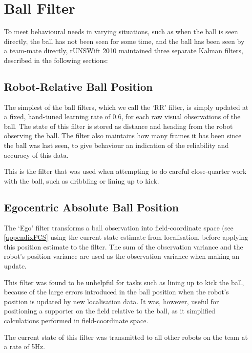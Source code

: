 \documentclass[pdftex,11pt,a4paper]{report}
\begin{document}
\section{Ball Filter} \label{secBallFilter}

To meet behavioural needs in varying situations, such as when the ball is seen directly, the ball has not been seen for some time, and the ball has been seen by a team-mate directly, rUNSWift 2010 maintained three separate Kalman filters, described in the following sections:

\subsection{Robot-Relative Ball Position}

The simplest of the ball filters, which we call the `RR' filter, is simply updated at a fixed, hand-tuned learning rate of 0.6, for each raw visual observations of the ball. The state of this filter is stored as distance and heading from the robot observing the ball. The filter also maintains how many frames it has been since the ball was last seen, to give behaviour an indication of the reliability and accuracy of this data.

This is the filter that was used when attempting to do careful close-quarter work with the ball, such as dribbling or lining up to kick.

\subsection{Egocentric Absolute Ball Position}

The `Ego' filter transforms a ball observation into field-coordinate space (see \autoref{appendixFCS} using the current state estimate from localisation, before applying this position estimate to the filter. The sum of the observation variance and the robot's position variance are used as the observation variance when making an update.

This filter was found to be unhelpful for tasks such as lining up to kick the ball, because of the large errors introduced in the ball position when the robot's position is updated by new localisation data. It was, however, useful for positioning a supporter on the field relative to the ball, as it simplified calculations performed in field-coordinate space.

The current state of this filter was transmitted to all other robots on the team at a rate of 5Hz.
\end{document}
